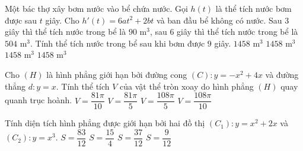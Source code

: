 \begin{ex}%
	Một bác thợ xây bơm nước vào bể chứa nước. Gọi $h(t)$ là thể tích nước bơm được sau $t$ giây. Cho $h'(t) = 6at^2 +2bt$ và ban đầu bể không có nước. Sau 3 giây thì thể tích nước trong bể là $90$ m$^3$, sau 6 giây thì thể tích nước trong bể là $504$ m$^3$. Tính thể tích nước trong bể sau khi bơm được $9$ giây.
	\choice 
	{\True $1458$ m$^3$}
	{$1458$ m$^3$}
	{$1458$ m$^3$}
	{$1458$ m$^3$}
\end{ex}

\begin{ex}%
	Cho $(H)$ là hình phẳng giới hạn bởi đường cong $(C):y=-x^2+4x$ và đường thẳng $d:y=x$. Tính thể tích $V$ của vật thể tròn xoay do hình phẳng $(H)$ quay quanh trục hoành.
	\choice 
	{$V=\dfrac{81\pi}{10}$}
	{$V=\dfrac{81\pi}{5}$}
	{\True $V=\dfrac{108\pi}{5}$}
	{$V=\dfrac{108\pi}{10}$}
\end{ex}

\begin{ex}%
	Tính diện tích hình phẳng được giới hạn bởi hai đồ thị $(C_1):y=x^2+2x$ và $(C_2):y=x^3$.
	\choice 
	{$S=\dfrac{83}{12}$}
	{$S=\dfrac{15}{4}$}
	{\True $S=\dfrac{37}{12}$}
	{$S=\dfrac{9}{12}$}
\end{ex}

